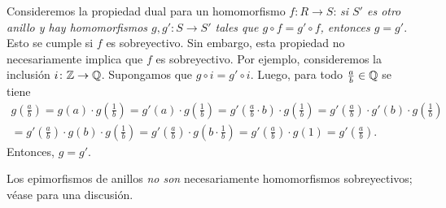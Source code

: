 \begin{ejemplo}
  Consideremos la propiedad dual para un homomorfismo $f\colon R\to S$:
  \emph{si $S'$ es otro anillo y hay homomorfismos $g, g'\colon S\to S'$ tales
    que $g\circ f = g'\circ f$, entonces $g = g'$}. Esto se cumple si $f$
  es sobreyectivo. Sin embargo, esta propiedad no necesariamente implica que $f$
  es sobreyectivo. Por ejemplo, consideremos la inclusión
  $i\colon \mathbb{Z}\to \mathbb{Q}$. Supongamos que $g\circ i = g'\circ i$. Luego, para todo
  $\frac{a}{b} \in \mathbb{Q}$ se tiene
  \begin{multline*}
    g \left(\frac{a}{b}\right) =
    g (a)\cdot g \left(\frac{1}{b}\right) =
    g' (a)\cdot g \left(\frac{1}{b}\right) =
    g' \left(\frac{a}{b}\cdot b\right)\cdot g \left(\frac{1}{b}\right) =
    g' \left(\frac{a}{b}\right)\cdot g' (b)\cdot g \left(\frac{1}{b}\right) \\
    = g' \left(\frac{a}{b}\right)\cdot g (b)\cdot g \left(\frac{1}{b}\right) =
    g' \left(\frac{a}{b}\right)\cdot g \left(b\cdot \frac{1}{b}\right) =
    g' \left(\frac{a}{b}\right)\cdot g (1) =
    g' \left(\frac{a}{b}\right).
  \end{multline*}
  Entonces, $g = g'$.

  Los epimorfismos de anillos \emph{no son} necesariamente homomorfismos
  sobreyectivos; véase \cite{Roby-1968} para una discusión.
\end{ejemplo}


